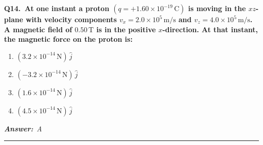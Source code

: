 \documentclass[11pt]{article}
\newcommand{\QuestionStyle}[1]{{\large\bfseries\boldmath #1}}
\newcommand{\AnswerStyle}[1]{{\large\bfseries\boldmath #1}}
\newcommand{\ReasonStyle}[1]{{\normalsize #1}}
\newif\ifshowreason
\newcommand{\Correct}[2]{%
  \item \AnswerStyle{\textcolor{AnsRed}{#1}}%
  \ifshowreason\\[-0.2em]
    \ReasonStyle{\textcolor{AnsRed}{#2}}%
  \fi
}
\newcommand{\Wrong}[2]{%
  \item \AnswerStyle{\textcolor{WrongBlue}{#1}}%
  \ifshowreason\\[-0.2em]
    \ReasonStyle{\textcolor{WrongBlue}{#2}}%
  \fi
}
\newcommand{\QBlock}[4]{%
  \Needspace{8\baselineskip}%
  \noindent
  \begin{minipage}{\linewidth}
    \QuestionStyle{#1.~#2}

    \vspace{0.25em}
    \begin{enumerate}
      #3
    \end{enumerate}

    \vspace{0.1em}
    \noindent\textcolor{AnsRed}{\textit{\textbf{Answer:}~#4}}

    \vspace{0.25em}
    \hrule height 0.4pt
  \end{minipage}
  \vspace{0.75em}
}
\begin{document}
\QBlock{Q14}{At one instant a proton $(q=+1.60\times10^{-19}\,\text{C})$ is moving in the $xz$-plane with velocity components $v_x=2.0\times10^5\,\text{m/s}$ and $v_z=4.0\times10^5\,\text{m/s}$. A magnetic field of $0.50\,\text{T}$ is in the positive $x$-direction. At that instant, the magnetic force on the proton is:}{
\Correct{$(3.2\times10^{-14}\,\text{N})\,\hat j$}{The magnetic force is $\vec F=q\,\vec v\times\vec B$. Only the $v_z$ component contributes because $v_x$ is parallel to $\vec B$; thus $|\vec F|=qv_zB=(1.60\times10^{-19})(4.0\times10^5)(0.50)=3.2\times10^{-14}\,\text{N}$, and since $\hat k\times\hat i=\hat j$ for a positive charge, the direction is $+\hat j$.}
\Wrong{$(-3.2\times10^{-14}\,\text{N})\,\hat j$}{This gets the magnitude right but reverses the direction, as if the particle had negative charge instead of positive charge.}
\Wrong{$(1.6\times10^{-14}\,\text{N})\,\hat j$}{This uses only half the correct magnitude, typically from substituting the wrong velocity component or field value.}
\Wrong{$(4.5\times10^{-14}\,\text{N})\,\hat j$}{This likely combines both velocity components as if all of $\vec v$ were perpendicular to $\vec B$, which is not true here.}
}{A}
\end{document}
